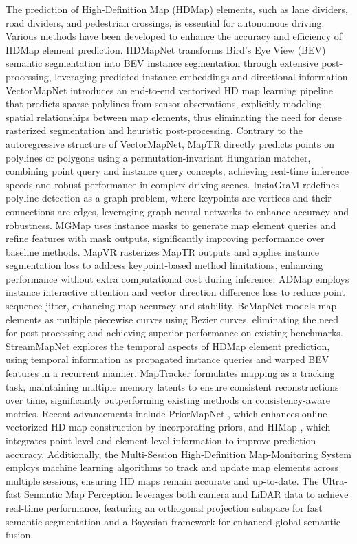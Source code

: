 The prediction of High-Definition Map (HDMap) elements, such as lane dividers, road dividers, and pedestrian crossings, is essential for autonomous driving. Various methods have been developed to enhance the accuracy and efficiency of HDMap element prediction. HDMapNet \cite{li2022hdmapnet} transforms Bird’s Eye View (BEV) semantic segmentation into BEV instance segmentation through extensive post-processing, leveraging predicted instance embeddings and directional information. VectorMapNet \cite{liu2023vectormapnet} introduces an end-to-end vectorized HD map learning pipeline that predicts sparse polylines from sensor observations, explicitly modeling spatial relationships between map elements, thus eliminating the need for dense rasterized segmentation and heuristic post-processing. Contrary to the autoregressive structure of VectorMapNet, MapTR \cite{liao2022maptr} directly predicts points on polylines or polygons using a permutation-invariant Hungarian matcher, combining point query and instance query concepts, achieving real-time inference speeds and robust performance in complex driving scenes. InstaGraM \cite{shin2023instagram} redefines polyline detection as a graph problem, where keypoints are vertices and their connections are edges, leveraging graph neural networks to enhance accuracy and robustness. MGMap \cite{liu2024mgmap} uses instance masks to generate map element queries and refine features with mask outputs, significantly improving performance over baseline methods. MapVR \cite{zhang2024online} rasterizes MapTR outputs and applies instance segmentation loss to address keypoint-based method limitations, enhancing performance without extra computational cost during inference. ADMap \cite{hu2024admap} employs instance interactive attention and vector direction difference loss to reduce point sequence jitter, enhancing map accuracy and stability. BeMapNet \cite{qiao2023end} models map elements as multiple piecewise curves using Bezier curves, eliminating the need for post-processing and achieving superior performance on existing benchmarks. StreamMapNet \cite{yuan2024streammapnet} explores the temporal aspects of HDMap element prediction, using temporal information as propagated instance queries and warped BEV features in a recurrent manner. MapTracker \cite{chen2025maptracker} formulates mapping as a tracking task, maintaining multiple memory latents to ensure consistent reconstructions over time, significantly outperforming existing methods on consistency-aware metrics. Recent advancements include PriorMapNet \cite{wang2024priormapnet}, which enhances online vectorized HD map construction by incorporating priors, and HIMap \cite{zhou2024himap}, which integrates point-level and element-level information to improve prediction accuracy. Additionally, the Multi-Session High-Definition Map-Monitoring System \cite{wijaya2023multi} employs machine learning algorithms to track and update map elements across multiple sessions, ensuring HD maps remain accurate and up-to-date. The Ultra-fast Semantic Map Perception \cite{xu2024ultra} leverages both camera and LiDAR data to achieve real-time performance, featuring an orthogonal projection subspace for fast semantic segmentation and a Bayesian framework for enhanced global semantic fusion.


